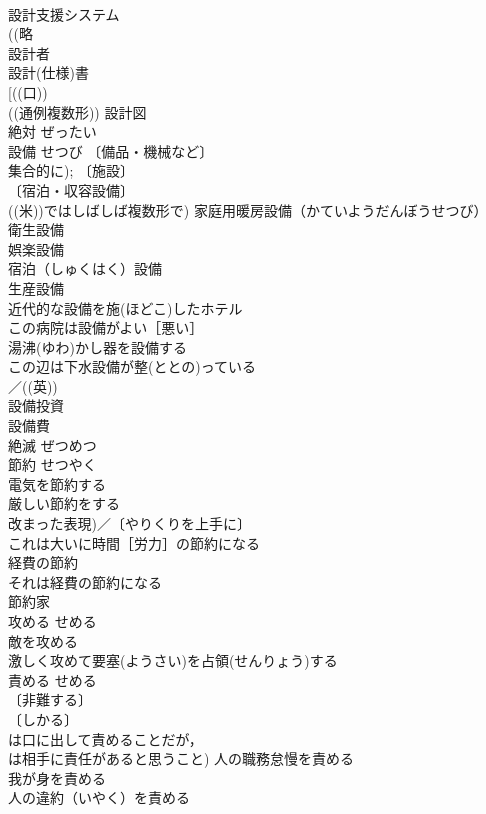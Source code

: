 \documentclass[8pt]{extreport}
\begin{document}
\begin{CJK}{UTF8}{min}
\\	設計支援システム 
\\	((略
\\	設計者 
\\	設計(仕様)書 
\\	[((口)) 
\\	((通例複数形)) 設計図 
\\	絶対	ぜったい	
\\	設備	せつび	〔備品・機械など〕
\\	集合的に); 〔施設〕
\\	〔宿泊・収容設備〕
\\	((米))ではしばしば複数形で) 家庭用暖房設備（かていようだんぼうせつび） 
\\	衛生設備 
\\	娯楽設備 
\\	宿泊（しゅくはく）設備 
\\	生産設備 
\\	近代的な設備を施(ほどこ)したホテル 
\\	この病院は設備がよい［悪い］ 
\\	湯沸(ゆわ)かし器を設備する 
\\	この辺は下水設備が整(ととの)っている 
\\	／((英)) 
\\	設備投資 
\\	設備費 
\\	絶滅	ぜつめつ	
\\	節約	せつやく	
\\	電気を節約する 
\\	厳しい節約をする 
\\	改まった表現)／〔やりくりを上手に〕
\\	これは大いに時間［労力］の節約になる 
\\	経費の節約 
\\	それは経費の節約になる 
\\	節約家 
\\	攻める	せめる	
\\	敵を攻める 
\\	激しく攻めて要塞(ようさい)を占領(せんりょう)する 
\\	責める	せめる	
\\	〔非難する〕
\\	〔しかる〕
\\	は口に出して責めることだが，
\\	は相手に責任があると思うこと) 人の職務怠慢を責める 
\\	我が身を責める 
\\	人の違約（いやく）を責める

\end{CJK}
\end{document}
